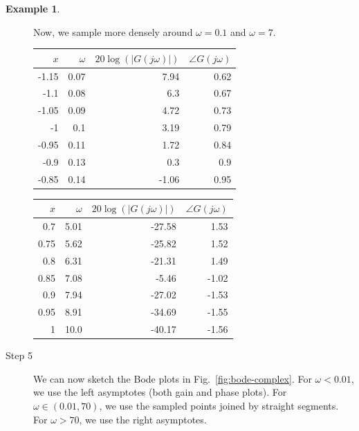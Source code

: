 \documentclass[a4paper,11pt]{report}
\theoremstyle{definition}
\newtheorem{mdexample}{Example}
\newenvironment{example}%
  {\vspace{0.1cm}\begin{mdframed}[backgroundcolor=lightgray]\begin{mdexample}}%
  {\end{mdexample}\end{mdframed}\vspace{0.1cm}}
\begin{document}
\begin{example}
\begin{description}
  Now, we sample more densely around $\omega=0.1$ and $\omega=7$.

  \begin{tabular}{|r|r|r|r|}
    \hline
    $x$ & $\omega$ & $20\log(|G(j\omega)|)$ & $\angle G(j\omega)$\\
    \hline
    -1.15 & 0.07 & 7.94 & 0.62 \\
    -1.1 & 0.08 & 6.3 & 0.67 \\
    -1.05 & 0.09 & 4.72 & 0.73 \\
    -1 & 0.1 & 3.19 & 0.79 \\
    -0.95 & 0.11 & 1.72 & 0.84 \\
    -0.9 & 0.13 & 0.3 & 0.9 \\
    -0.85 & 0.14 & -1.06 & 0.95 \\
    \hline
  \end{tabular}

  \begin{tabular}{|r|r|r|r|}
    \hline
    $x$ & $\omega$ & $20\log(|G(j\omega)|)$ & $\angle G(j\omega)$\\
    \hline
    0.7 & 5.01 & -27.58 & 1.53 \\
    0.75 & 5.62 & -25.82 & 1.52 \\
    0.8 & 6.31 & -21.31 & 1.49 \\
    0.85 & 7.08 & -5.46 & -1.02 \\
    0.9 & 7.94 & -27.02 & -1.53 \\
    0.95 & 8.91 & -34.69 & -1.55 \\
    1 & 10.0 & -40.17 & -1.56 \\
    \hline
  \end{tabular}

  \item[Step 5] We can now sketch the Bode plots in
    Fig.~\ref{fig:bode-complex}. For $\omega<0.01$, we use the left
    asymptotes (both gain and phase plots). For $\omega\in(0.01,70)$,
    we use the sampled points joined by straight segments. For
    $\omega>70$, we use the right asymptotes.


\end{description}
\end{example}
\end{document}
